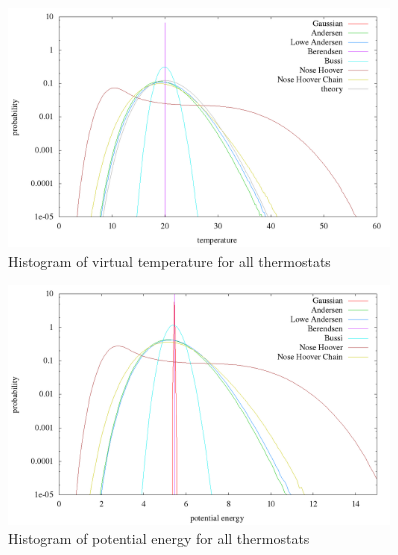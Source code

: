 \begin{figure}[H]
\centering
\includegraphics[width=0.9\textwidth]{./graphics/Histogramm_tempCol_rand_T=20_p=64.png}
\caption{Histogram of virtual temperature for all thermostats}
\label{im:temp_rand}
\end{figure}

\begin{figure}[H]
\centering
\includegraphics[width=0.9\textwidth]{./graphics/Histogramm_epot_rand_T=20_p=64.png}
\caption{Histogram of potential energy for all thermostats}
\label{im:epot_rand}
\end{figure}

